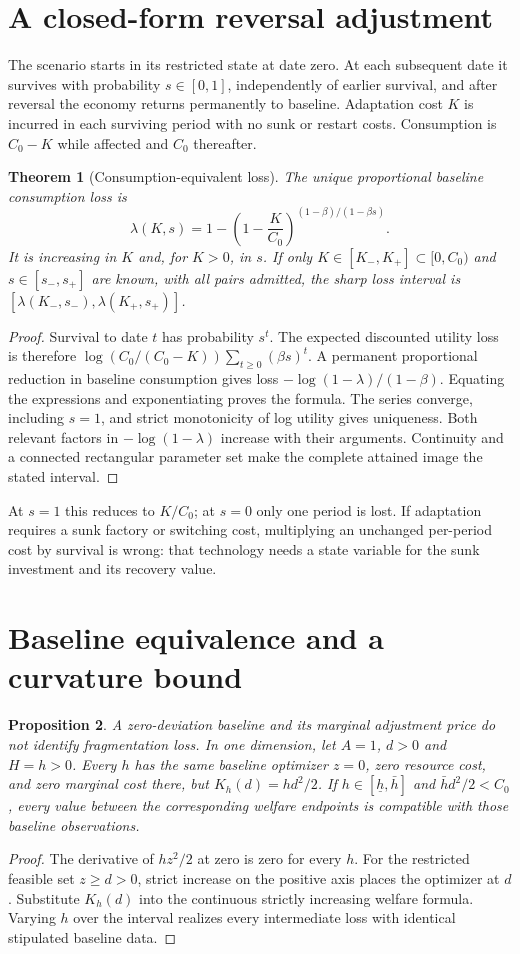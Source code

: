 \documentclass[11pt]{article}
\newtheorem{theorem}{Theorem}
\newtheorem{proposition}[theorem]{Proposition}
\theoremstyle{definition}
\begin{document}
\section*{A closed-form reversal adjustment}
The scenario starts in its restricted state at date zero. At each subsequent
date it survives with probability $s\in[0,1]$, independently of earlier
survival, and after reversal the economy returns permanently to baseline.
Adaptation cost $K$ is incurred in each surviving period with no sunk or
restart costs. Consumption is $C_0-K$ while affected and $C_0$ thereafter.
\begin{theorem}[Consumption-equivalent loss]
The unique proportional baseline consumption loss is
\[
 \lambda(K,s)=1-\left(1-\frac K{C_0}\right)^{(1-\beta)/(1-\beta s)}.
\]
It is increasing in $K$ and, for $K>0$, in $s$. If only
$K\in[K_-,K_+]\subset[0,C_0)$ and $s\in[s_-,s_+]$ are known, with
all pairs admitted, the sharp loss interval is
$[\lambda(K_-,s_-),\lambda(K_+,s_+)]$.
\end{theorem}
\begin{proof}
Survival to date $t$ has probability $s^t$. The expected discounted utility
loss is therefore
$\log(C_0/(C_0-K))\sum_{t\ge0}(\beta s)^t$.
A permanent proportional reduction in baseline consumption gives loss
$-\log(1-\lambda)/(1-\beta)$. Equating the expressions and exponentiating
proves the formula. The series converge, including $s=1$, and strict
monotonicity of log utility gives uniqueness. Both relevant factors in
$-\log(1-\lambda)$ increase with their arguments. Continuity and a connected
rectangular parameter set make the complete attained image the stated interval.
\end{proof}

At $s=1$ this reduces to $K/C_0$; at $s=0$ only one period is lost.
If adaptation requires a sunk factory or switching cost, multiplying an
unchanged per-period cost by survival is wrong: that technology needs a
state variable for the sunk investment and its recovery value.

\section*{Baseline equivalence and a curvature bound}
\begin{proposition}
A zero-deviation baseline and its marginal adjustment price do not identify
fragmentation loss. In one dimension, let $A=1$, $d>0$ and $H=h>0$.
Every $h$ has the same baseline optimizer $z=0$, zero resource cost, and
zero marginal cost there, but
$K_h(d)=hd^2/2$. If $h\in[\underline h,\bar h]$ and
$\bar h d^2/2<C_0$, every value between the corresponding welfare endpoints
is compatible with those baseline observations.
\end{proposition}
\begin{proof}
The derivative of $hz^2/2$ at zero is zero for every $h$.
For the restricted feasible set $z\ge d>0$, strict increase on the positive
axis places the optimizer at $d$. Substitute $K_h(d)$ into the continuous
strictly increasing welfare formula. Varying $h$ over the interval realizes
every intermediate loss with identical stipulated baseline data.
\end{proof}
\end{document}
